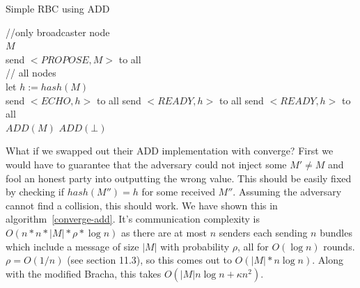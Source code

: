 \documentclass{article}
\begin{document}
\begin{algorithm}\label{bracha-add}
\caption{Simple RBC using ADD \cite{das2021add}}



//only broadcaster node\\
\Input $M$\\
send $<PROPOSE, M>$ to all\\
// all nodes\\
{
	let $h := hash(M)$\\
	send $<ECHO, h>$ to all
}
{
	send $<READY, h>$ to all
}
{
	send $<READY, h>$ to all\\
}
{
	{
		$ADD(M)$
	}
	\Else
	{
		$ADD(\bot)$
	}
}
\SetAlgoLined
\SetAlgoNoEnd
\end{algorithm}

What if we swapped out their ADD implementation with converge? First we would have to guarantee that the adversary could not inject some $M' \neq M$ and fool an honest party into outputting the wrong value. This should be easily fixed by checking if $hash(M'') = h$ for some received $M''$. Assuming the adversary cannot find a collision, this should work. We have shown this in algorithm~\ref{converge-add}. It's communication complexity is $O(n * n * |M| * \rho * \log n)$ as there are at most $n$ senders each sending $n$ bundles which include a message of size $|M|$ with probability $\rho$, all for $O(\log n)$ rounds. $\rho = O(1/n)$ (see section 11.3), so this comes out to $O(|M| * n \log n)$. Along with the modified Bracha, this takes $O(|M| n\log n + \kappa n^2)$.
\end{document}
